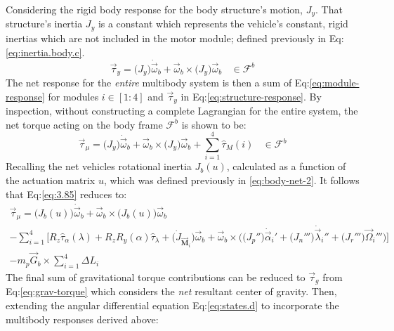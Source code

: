 Considering the rigid body response for the body structure's motion, $J_y$. That structure's inertia $J_y$ is a constant which represents the vehicle's constant, rigid inertias which are not included in the motor module; defined previously in Eq:\ref{eq:inertia.body.c}.
\begin{equation}\label{eq:structure-response}
\vec{\tau}_y=\big(J_y\big)\dot{\vec{\omega}}_b+\vec{\omega}_b\times\big(J_y\big)\vec{\omega}_b~~~~\in\mathcal{F}^b
\end{equation}
The net response for the \emph{entire} multibody system is then a sum of Eq:\ref{eq:module-response} for modules $i\in[1:4]$ and $\vec{\tau}_y$ in Eq:\ref{eq:structure-response}. By inspection, without constructing a complete Lagrangian for the entire system, the net torque acting on the body frame $\mathcal{F}^b$ is shown to be:
\begin{equation}\label{eq:3.85}
\vec{\tau}_\mu = \big(J_y\big)\dot{\vec{\omega}}_b+\vec{\omega}_b\times\big(J_y\big)\vec{\omega}_b+\sum_{i=1}^{4}\hat{\tau}_{M}(i)~~~~\in\mathcal{F}^b
\end{equation}
Recalling the net vehicles rotational inertia $J_b(u)$, calculated as a function of the actuation matrix $u$, which was defined previously in \ref{eq:body-net-2}. It follows that Eq:\ref{eq:3.85} reduces to:
\begin{multline}\label{eq:3.109}
\vec{\tau}_\mu=\big(J_b(u)\big)\dot{\vec{\omega}}_b+\vec{\omega}_b\times\big(J_b(u)\big)\vec{\omega}_b
\\
-\sum_{i=1}^{4}\Big[R_z\hat{\tau}_\alpha(\lambda)+R_zR_y(\alpha)\hat{\tau}_\lambda+\big(\dot{J}_{\vec{\mathbf{M}}_i}\big)\vec{\omega}_b+\vec{\omega}_b\times\Big(\big(J_p''\big)\dot{\vec{\alpha}}_i'+\big(J_n'''\big)\dot{\vec{\lambda}}_i''+\big(J_r'''\big)\vec{\Omega}_i'''\Big)\Big]
\\
-m_p\vec{G}_b\times\sum_{i=1}^{4}\Delta L_i
\end{multline}
The final sum of gravitational torque contributions can be reduced to $\vec{\tau}_g$ from Eq:\ref{eq:grav-torque} which considers the \emph{net} resultant center of gravity. Then, extending the angular differential equation Eq:\ref{eq:states.d} to incorporate the multibody responses derived above:
